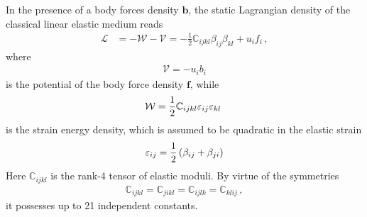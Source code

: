 
 


In the presence of a body forces density $\bm b$, 
the  static Lagrangian density of the classical linear elastic medium reads
\begin{align}
\mathcal{L}&=-\mathcal{W}-\mathcal{V}\nonumber=-\frac{1}{2}\mathbb{C}_{ijkl}\beta_{ij}\beta_{kl}+u_if_i\, ,
\end{align}
where 
\begin{align}
\label{V}
\mathcal{V}=-u_i b_i
\end{align}
is the potential of the body force density $\bm f$, while 
\begin{align}
\mathcal{W}=\frac{1}{2}\mathbb{C}_{ijkl}\eEc_{ij}\eEc_{kl}\ 
\label{W_classical}
\end{align}
is the strain energy density, which is assumed to be quadratic in the elastic strain
\begin{align}
\varepsilon_{ij}=\frac{1}{2}\left(\beta_{ij}+\beta_{ji}\right)
\end{align}
Here $\mathbb{C}_{ijkl}$ is the  rank-4 tensor of elastic moduli. By virtue of the symmetries
\begin{align}
\label{C}
\mathbb{C}_{ijkl}=\mathbb{C}_{jikl}=\mathbb{C}_{ijlk}=\mathbb{C}_{klij}\,,
\end{align}
it possesses up to 21 independent constants. 


